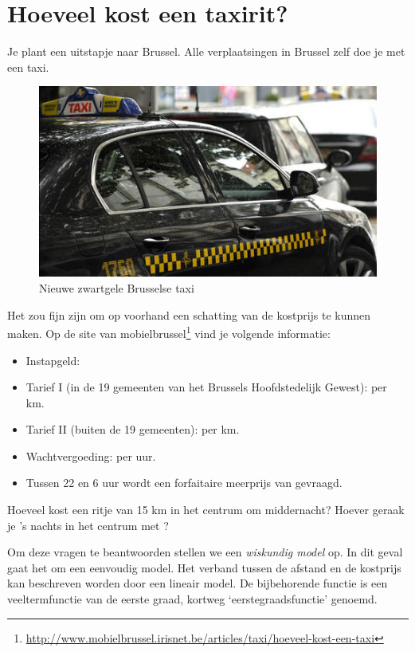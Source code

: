 \section{Hoeveel kost een taxirit?}\label{sec:taxirit}
Je plant een uitstapje naar Brussel. Alle verplaatsingen in Brussel zelf doe je met een taxi. 
 \begin{figure}[htbp]
      \centering
     \includegraphics[width=\textwidth]{figuren/eerstegraadsfuncties/taxi.jpg}
     \caption{Nieuwe zwartgele Brusselse taxi}
     \label{fig:taxi}
 \end{figure}
Het zou fijn zijn om op voorhand een schatting van de kostprijs te kunnen maken. Op de site van mobielbrussel\footnote{\url{http://www.mobielbrussel.irisnet.be/articles/taxi/hoeveel-kost-een-taxi}} vind je volgende informatie:
\begin{itemize}
\item Instapgeld: 
\item Tarief I (in de 19 gemeenten van het Brussels Hoofdstedelijk Gewest):  per km.
\item Tarief II (buiten de 19 gemeenten):  per km.
\item Wachtvergoeding:  per uur.
\item Tussen 22 en 6 uur wordt een forfaitaire meerprijs van  gevraagd.
\end{itemize}
Hoeveel kost een ritje van 15 km in het centrum om middernacht?  Hoever geraak je 's nachts in het centrum met ? 

Om deze vragen te beantwoorden stellen we een \emph{wiskundig model} op. In dit geval gaat het om een eenvoudig model. Het verband tussen de afstand en de kostprijs kan beschreven worden door een lineair model. De bijbehorende functie is een veeltermfunctie van de eerste graad, kortweg `eerstegraadsfunctie' genoemd.

